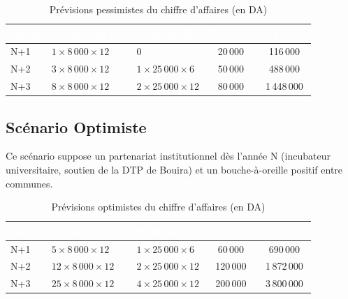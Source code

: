 \documentclass[12pt,a4paper]{report}
\newcommand{\thdcell}[1]{%
  \cellcolor{tabhead}\textbf{\textcolor{white}{#1}}%
}
\begin{document}
\begin{table}[H]
  \centering
  \caption{Prévisions pessimistes du chiffre d'affaires (en DA)}
  \renewcommand{\arraystretch}{1.4}
  \begin{tabularx}{\linewidth}{lXXcc}
    \toprule
    \rowcolor{primary}
    \thdcell{Année} & \thdcell{Communes (A)} & \thdcell{Wilayas (B)} &
    \thdcell{Pub. (C)} & \thdcell{CA total} \\
    \midrule

    N+1 & $1 \times 8\,000 \times 12$ & 0                       & 20\,000 & 116\,000   \\
    \rowcolor{lightgray}
    N+2 & $3 \times 8\,000 \times 12$ & $1 \times 25\,000 \times 6$ & 50\,000 & 488\,000 \\
    N+3 & $8 \times 8\,000 \times 12$ & $2 \times 25\,000 \times 12$ & 80\,000 & 1\,448\,000 \\

    \bottomrule
  \end{tabularx}
\end{table}

\subsection{Scénario Optimiste}

Ce scénario suppose un partenariat institutionnel dès l'année N (incubateur
universitaire, soutien de la DTP de Bouira) et un bouche-à-oreille positif
entre communes.

\begin{table}[H]
  \centering
  \caption{Prévisions optimistes du chiffre d'affaires (en DA)}
  \renewcommand{\arraystretch}{1.4}
  \begin{tabularx}{\linewidth}{lXXcc}
    \toprule
    \rowcolor{primary}
    \thdcell{Année} & \thdcell{Communes (A)} & \thdcell{Wilayas (B)} &
    \thdcell{Pub. (C)} & \thdcell{CA total} \\
    \midrule

    N+1 & $5 \times 8\,000 \times 12$  & $1 \times 25\,000 \times 6$  & 60\,000  & 690\,000   \\
    \rowcolor{lightgray}
    N+2 & $12 \times 8\,000 \times 12$ & $2 \times 25\,000 \times 12$ & 120\,000 & 1\,872\,000 \\
    N+3 & $25 \times 8\,000 \times 12$ & $4 \times 25\,000 \times 12$ & 200\,000 & 3\,800\,000 \\

    \bottomrule
  \end{tabularx}
\end{table}
\end{document}
